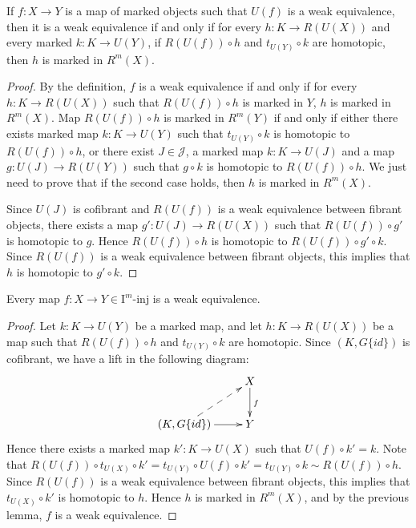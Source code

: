 \documentclass[reqno]{amsart}
\theoremstyle{definition}
\theoremstyle{remark}
\newcommand{\I}{\mathrm{I}}
\newcommand{\class}[2]{#1\text{-}\mathrm{#2}}
\newcommand{\Iinj}[1][\I]{\class{#1}{inj}}
\numberwithin{figure}{section}
\begin{document}
\begin{lem}[we]
If $f : X \to Y$ is a map of marked objects such that $U(f)$ is a weak equivalence,
then it is a weak equivalence if and only if for every $h : K \to R(U(X))$ and every marked $k : K \to U(Y)$,
if $R(U(f)) \circ h$ and $t_{U(Y)} \circ k$ are homotopic, then $h$ is marked in $R^m(X)$.
\end{lem}
\begin{proof}
By the definition, $f$ is a weak equivalence if and only if for every $h : K \to R(U(X))$ such that $R(U(f)) \circ h$ is marked in $Y$, $h$ is marked in $R^m(X)$.
Map $R(U(f)) \circ h$ is marked in $R^m(Y)$ if and only if either there exists marked map $k : K \to U(Y)$ such that $t_{U(Y)} \circ k$ is homotopic to $R(U(f)) \circ h$,
or there exist $J \in \mathcal{J}$, a marked map $k : K \to U(J)$ and a map $g : U(J) \to R(U(Y))$ such that $g \circ k$ is homotopic to $R(U(f)) \circ h$.
We just need to prove that if the second case holds, then $h$ is marked in $R^m(X)$.

Since $U(J)$ is cofibrant and $R(U(f))$ is a weak equivalence between fibrant objects,
there exists a map $g' : U(J) \to R(U(X))$ such that $R(U(f)) \circ g'$ is homotopic to $g$.
Hence $R(U(f)) \circ h$ is homotopic to $R(U(f)) \circ g' \circ k$.
Since $R(U(f))$ is a weak equivalence between fibrant objects, this implies that $h$ is homotopic to $g' \circ k$.
\end{proof}

\begin{prop}[iinj]
Every map $f : X \to Y \in \Iinj[\I^m]$ is a weak equivalence.
\end{prop}
\begin{proof}
Let $k : K \to U(Y)$ be a marked map, and let $h : K \to R(U(X))$ be a map such that $R(U(f)) \circ h$ and $t_{U(Y)} \circ k$ are homotopic.
Since $(K, G \{id\})$ is cofibrant, we have a lift in the following diagram:
\[ \xymatrix{                                    & X \ar[d]^f \\
              (K, G \{id\}) \ar[r] \ar@{-->}[ur] & Y
            } \]
Hence there exists a marked map $k' : K \to U(X)$ such that $U(f) \circ k' = k$.
Note that $R(U(f)) \circ t_{U(X)} \circ k' = t_{U(Y)} \circ U(f) \circ k' = t_{U(Y)} \circ k \sim R(U(f)) \circ h$.
Since $R(U(f))$ is a weak equivalence between fibrant objects, this implies that $t_{U(X)} \circ k'$ is homotopic to $h$.
Hence $h$ is marked in $R^m(X)$, and by the previous lemma, $f$ is a weak equivalence.
\end{proof}
\end{document}
